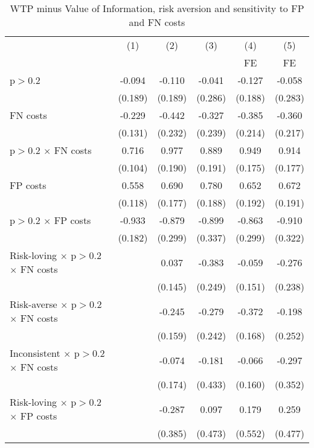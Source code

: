 \begin{table}[htbp]\centering
\caption{WTP minus Value of Information, risk aversion and sensitivity to FP and FN costs}
\begin{tabular}{l*{5}{c}}
\hline\hline
                &\multicolumn{1}{c}{(1)}&\multicolumn{1}{c}{(2)}&\multicolumn{1}{c}{(3)}&\multicolumn{1}{c}{(4)}&\multicolumn{1}{c}{(5)}\\
                &\multicolumn{1}{c}{}&\multicolumn{1}{c}{}&\multicolumn{1}{c}{}&\multicolumn{1}{c}{FE}&\multicolumn{1}{c}{FE}\\
\hline
p$>$0.2         &   -0.094&   -0.110&   -0.041&   -0.127&   -0.058\\
                &  (0.189)&  (0.189)&  (0.286)&  (0.188)&  (0.283)\\
FN costs        &   -0.229&   -0.442&   -0.327&   -0.385&   -0.360\\
                &  (0.131)&  (0.232)&  (0.239)&  (0.214)&  (0.217)\\
p$>$0.2 $\times$ FN costs&    0.716&    0.977&    0.889&    0.949&    0.914\\
                &  (0.104)&  (0.190)&  (0.191)&  (0.175)&  (0.177)\\
FP costs        &    0.558&    0.690&    0.780&    0.652&    0.672\\
                &  (0.118)&  (0.177)&  (0.188)&  (0.192)&  (0.191)\\
p$>$0.2 $\times$ FP costs&   -0.933&   -0.879&   -0.899&   -0.863&   -0.910\\
                &  (0.182)&  (0.299)&  (0.337)&  (0.299)&  (0.322)\\
Risk-loving $\times$ p$>$0.2 $\times$ FN costs&         &    0.037&   -0.383&   -0.059&   -0.276\\
                &         &  (0.145)&  (0.249)&  (0.151)&  (0.238)\\
Risk-averse $\times$ p$>$0.2 $\times$ FN costs&         &   -0.245&   -0.279&   -0.372&   -0.198\\
                &         &  (0.159)&  (0.242)&  (0.168)&  (0.252)\\
Inconsistent $\times$ p$>$0.2 $\times$ FN costs&         &   -0.074&   -0.181&   -0.066&   -0.297\\
                &         &  (0.174)&  (0.433)&  (0.160)&  (0.352)\\
Risk-loving $\times$ p$>$0.2 $\times$ FP costs&         &   -0.287&    0.097&    0.179&    0.259\\
                &         &  (0.385)&  (0.473)&  (0.552)&  (0.477)\\

\end{tabular}
\end{table}
